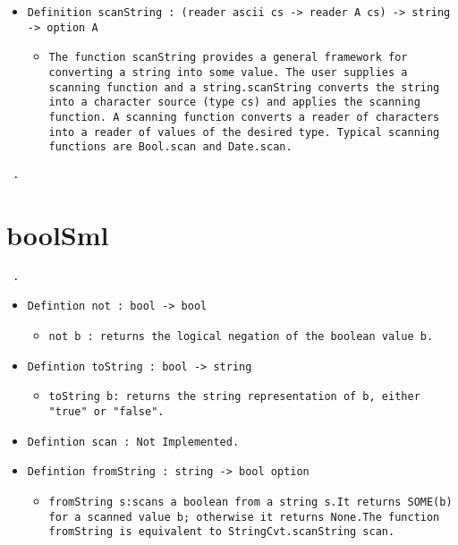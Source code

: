 \documentclass[11pt]{report}
\begin{document}
\begin{itemize}
\begin{itemize}
\end{itemize}

\item  \texttt{Definition scanString : (reader ascii cs -> reader A cs) -> string -> option A}

\begin{itemize}
\item  \texttt{The function scanString provides a general framework for converting a string into some value. The user supplies a scanning function and a string.scanString converts the string into a character source (type cs) and applies the scanning function. A scanning function converts a reader of characters into a reader of values of the desired type. Typical scanning functions are Bool.scan and Date.scan. }

\end{itemize}

\end{itemize}
\begin{coqdoccode}
\coqdocnoindent
\texttt{ .\coqdoceol}
\end{coqdoccode}
\section*{boolSml}

\begin{coqdoccode}
\coqdocemptyline
\coqdocnoindent
\texttt{ .\coqdoceol}
\coqdocemptyline
\end{coqdoccode}

\begin{itemize}
\item  \texttt{Defintion not : bool -> bool}


\begin{itemize}
\item  \texttt{not b : returns the logical negation of the boolean value b.}
\end{itemize}

\item  \texttt{Defintion toString : bool -> string}

\begin{itemize}
\item  \texttt{toString b: returns the string representation of b, either "true" or "false".}
\end{itemize}

\item  \texttt{Defintion scan : Not Implemented.}

\item  \texttt{Defintion fromString : string -> bool option}

\begin{itemize}
\item  \texttt{fromString s:scans a boolean from a string s.It returns SOME(b) for a scanned value b; otherwise it returns None.The function fromString is equivalent to StringCvt.scanString scan.} 
\end{itemize}

\end{itemize}
\end{document}
